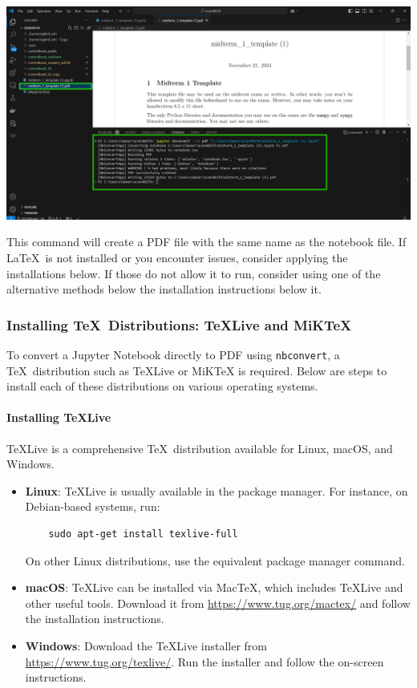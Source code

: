 \documentclass{article}
\begin{document}
\begin{center}
    \includegraphics[width=\linewidth]{pic11-output.png} 
\end{center}

This command will create a PDF file with the same name as the notebook file. If \LaTeX~is not installed or you encounter issues, consider applying the installations below. If those do not allow it to run, consider using one of the alternative methods below the installation instructions below it.

\subsubsection{Installing \TeX~Distributions: TeXLive and MiKTeX}

To convert a Jupyter Notebook directly to PDF using \texttt{nbconvert}, a \TeX~distribution such as TeXLive or MiKTeX is required. Below are steps to install each of these distributions on various operating systems.

\paragraph{Installing TeXLive}
TeXLive is a comprehensive \TeX~distribution available for Linux, macOS, and Windows.

\begin{itemize}
    \item \textbf{Linux}: TeXLive is usually available in the package manager. For instance, on Debian-based systems, run:
    \begin{verbatim}
    sudo apt-get install texlive-full
    \end{verbatim}
    On other Linux distributions, use the equivalent package manager command.
    
    \item \textbf{macOS}: TeXLive can be installed via MacTeX, which includes TeXLive and other useful tools. Download it from \url{https://www.tug.org/mactex/} and follow the installation instructions.
    
    \item \textbf{Windows}: Download the TeXLive installer from \url{https://www.tug.org/texlive/}. Run the installer and follow the on-screen instructions.
\end{itemize}
\end{document}
